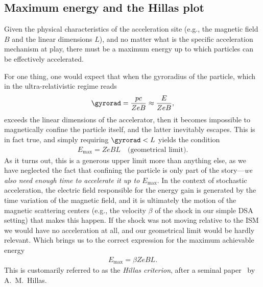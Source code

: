 \subsection{Maximum energy and the Hillas plot}

Given the physical characteristics of the acceleration site (e.g., the magnetic
field $B$ and the linear dimensions $L$), and no matter what is the specific acceleration
mechanism at play, there must be a maximum energy up to which particles can be
effectively accelerated.

For one thing, one would expect that when the gyroradius of the particle, which in
the ultra-relativistic regime reads
\begin{align*}
  \gyrorad = \frac{pc}{ZeB} \approx \frac{E}{ZeB},
\end{align*}
exceeds the linear dimensions of the accelerator, then it becomes impossible to
magnetically confine the particle itself, and the latter inevitably escapes. This is in
fact true, and simply requiring $\gyrorad < L$ yields the condition
\begin{align*}
  E_\text{max} = ZeBL \quad\text{(geometrical limit)}.
\end{align*}
As it turns out, this is a generous upper limit more than anything else, as we have
neglected the fact that confining the particle is only part of the story---\emph{we also
need enough time to accelerate it up to $E_\text{max}$}.
In the context of stochastic acceleration, the electric field responsible for the
energy gain is generated by the time variation of the magnetic field, and it is ultimately
the motion of the magnetic scattering centers (e.g., the velocity $\beta$ of the
shock in our simple DSA setting) that makes this happen. If the shock
was not moving relative to the ISM we would have no acceleration at all,
and our geometrical limit would be hardly relevant. Which brings us to the correct
expression for the maximum achievable energy
\begin{align}\label{eq:hillas_emax}
  E_\text{max} = \beta ZeBL.
\end{align}
This is customarily referred to as the \emph{Hillas criterion}, after a seminal
paper~\cite{1984ARA&A..22..425H} by A.~M.~Hillas.

